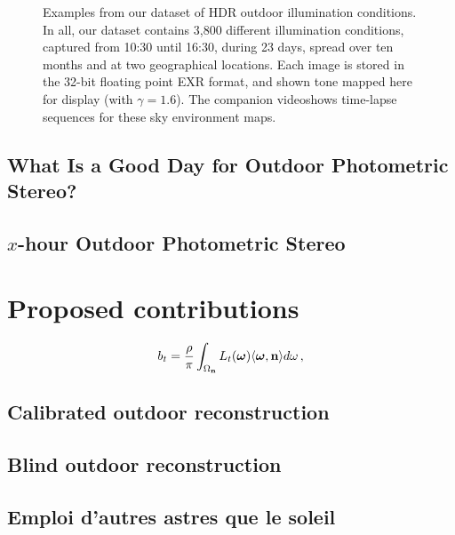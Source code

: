 \documentclass{report}
\begin{document}
\begin{figure}[!th]
\begin{tabular}{@{}rcccccccccccc@{}}
    \\

    \end{tabular}
   	\caption[]{Examples from our dataset of HDR outdoor illumination conditions. In all, our dataset contains 3,800 different illumination conditions, captured from 10:30 until 16:30, during 23 days, spread over ten months and at two geographical locations. Each image is stored in the 32-bit floating point EXR format, and shown tone mapped here for display (with $\gamma = 1.6$). The companion video\footnotemark shows time-lapse sequences for these sky environment maps.}
	\label{fig:database}
\end{figure}

\section{What Is a Good Day for Outdoor Photometric Stereo?}
\label{iccp15}

%

\section{$x$-hour Outdoor Photometric Stereo}
\label{3dv15}

%


\chapter{Proposed contributions}


\begin{equation}
b_t = \frac{\rho}{\pi} \int_{\Omega_{\bf n}} L_t(\mathbf{\boldsymbol \omega}) \langle \boldsymbol \omega, {\bf n} \rangle d\omega \,,
\end{equation}

\section{Calibrated outdoor reconstruction}

\section{Blind outdoor reconstruction}

\section{Emploi d'autres astres que le soleil}
\end{document}
